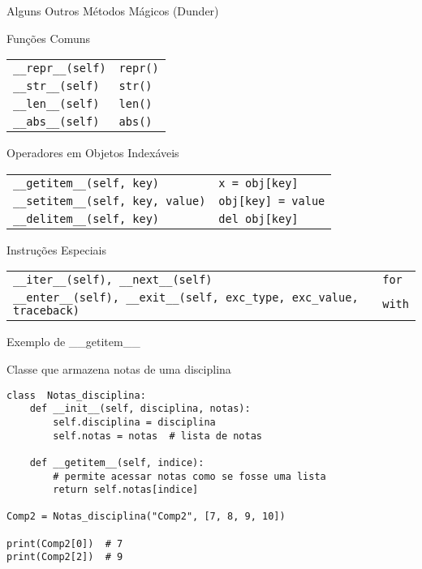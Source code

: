 \begin{frame}{Alguns Outros Métodos Mágicos (Dunder)}

    \begin{block}{Funções Comuns}
        \begin{tabular}{ll}
            \texttt{\_\_repr\_\_(self)} & \texttt{repr()} \\
            \texttt{\_\_str\_\_(self)}  & \texttt{str()}  \\
            \texttt{\_\_len\_\_(self)}  & \texttt{len()}  \\
            \texttt{\_\_abs\_\_(self)}  & \texttt{abs()}  \\
        \end{tabular}
    \end{block}

    \begin{block}{Operadores em Objetos Indexáveis}
        \begin{tabular}{ll}
            \texttt{\_\_getitem\_\_(self, key)}        & \texttt{x = obj[key]}     \\
            \texttt{\_\_setitem\_\_(self, key, value)} & \texttt{obj[key] = value} \\
            \texttt{\_\_delitem\_\_(self, key)}        & \texttt{del obj[key]}     \\
        \end{tabular}
    \end{block}

    \begin{block}{Instruções Especiais}
        \begin{tabular}{ll}
            \texttt{\_\_iter\_\_(self), \_\_next\_\_(self)}                                    & \texttt{for}  \\
            \texttt{\_\_enter\_\_(self), \_\_exit\_\_(self, exc\_type, exc\_value, traceback)} & \texttt{with} \\
        \end{tabular}
    \end{block}

\end{frame}

\begin{frame}[fragile]{Exemplo de \_\_getitem\_\_}

    \begin{exampleblock}{Classe que armazena notas de uma disciplina}
        \begin{verbatim}
class  Notas_disciplina:
    def __init__(self, disciplina, notas):
        self.disciplina = disciplina
        self.notas = notas  # lista de notas

    def __getitem__(self, indice):
        # permite acessar notas como se fosse uma lista
        return self.notas[indice]

Comp2 = Notas_disciplina("Comp2", [7, 8, 9, 10])

print(Comp2[0])  # 7
print(Comp2[2])  # 9
\end{verbatim}
    \end{exampleblock}




\end{frame}

